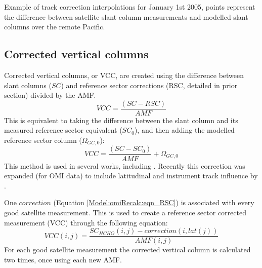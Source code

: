       {Example of track correction interpolations for January 1st 2005, points represent the difference between satellite slant column measurements and modelled slant columns over the remote Pacific.}
      {\label{Model:omiRecalc:RSC:fig_track_correction_interpolations}}
    
  
  \subsection{Corrected vertical columns}
    \label{Model:omiRecalc:vcc}
    
    Corrected vertical columns, or VCC, are created using the difference between slant columns ($SC$) and reference sector corrections (RSC, detailed in prior section) divided by the AMF. 
    \begin{equation}
      \label{Model:omiRecalc:vcc:eqn_vcc}
      VCC = \frac{ \left( SC - RSC \right) }{ AMF }
    \end{equation}
    This is equivalent to taking the difference between the slant column and its measured reference sector equivalent ($SC_0$), and then adding the modelled reference sector column ($\Omega_{GC,0}$):
    \begin{equation}
      \label{Model:omiRecalc:vcc:eqn_vcc_equiv}
      VCC = \frac{ \left( SC - SC_0 \right) }{ AMF } + \Omega_{GC,0}
    \end{equation}
    This method is used in several works, including \textcite[e.g.,][]{DeSmedt2008, DeSmedt2012, DeSmedt2015, Barkley2013, Bauwens2016}.
    Recently this correction was expanded (for OMI data) to include latitudinal and instrument track influence by \textcite{Abad2015}.
    
    One $correction$ (Equation \ref{Model:omiRecalc:eqn_RSC}) is associated with every good satellite measurement.
    This is used to create a reference sector corrected measurement (VCC) through the following equation:
    \begin{equation}
    VCC(i,j) = \frac{SC_{HCHO}(i,j) - correction(i,lat(j))}{AMF(i,j)}
    \end{equation}
    For each good satellite measurement the corrected vertical column is calculated two times, once using each new AMF.
    
